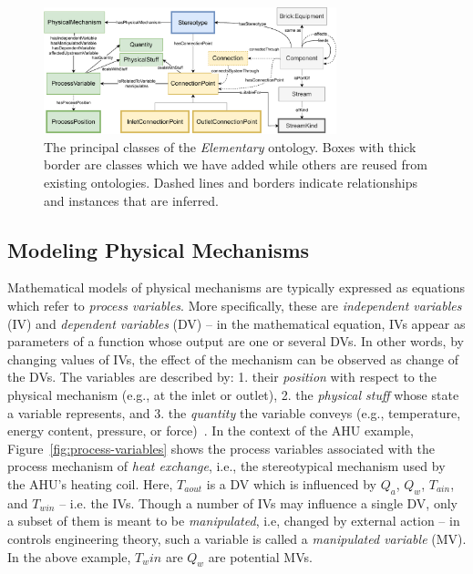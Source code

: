 \documentclass[sigconf]{acmart}
\begin{document}
\begin{figure}[t]
\centering
\includegraphics[width=8.5cm]{figures/a_overview_of_classes_in_elementary.pdf}
\caption{The principal classes of the \emph{Elementary} ontology. Boxes with thick border are classes which we have added while others are reused from existing ontologies. Dashed lines and borders indicate relationships and instances that are inferred.}

\label{fig:elementary-detailed-view}
\end{figure}


\subsection{Modeling Physical Mechanisms}

Mathematical models of physical mechanisms are typically expressed as equations which refer to \textit{process variables}.
More specifically, these are \textit{independent variables} (IV) and \textit{dependent variables} (DV) -- in the mathematical equation, IVs appear as parameters of a function whose output are one or several DVs.
In other words, by changing values of IVs, the effect of the mechanism can be observed as change of the DVs.
The variables are described by: 1. their \textit{position} with respect to the physical mechanism (e.g., at the inlet or outlet), 2. the \textit{physical stuff} whose state a variable represents, and 3. the \textit{quantity} the variable conveys (e.g., temperature, energy content, pressure, or force)~\cite{borst1995physsys,preisig2021ontology,cessenat2018mathematical}.
In the context of the AHU example, Figure~\ref{fig:process-variables} shows the process variables associated with the process mechanism of \emph{heat exchange}, i.e., the stereotypical mechanism used by the AHU's heating coil.
Here, $T_{aout}$ is a DV which is influenced by $Q_{a}$, $Q_{w}$, $T_{ain}$, and $T_{win}$ -- i.e. the IVs.
Though a number of IVs may influence a single DV, only a subset of them is meant to be \textit{manipulated}, i.e, changed by external action -- in controls engineering theory, such a variable is called a \textit{manipulated variable} (MV).
In the above example, $T_win$ are $Q_w$ are potential MVs.
\end{document}
